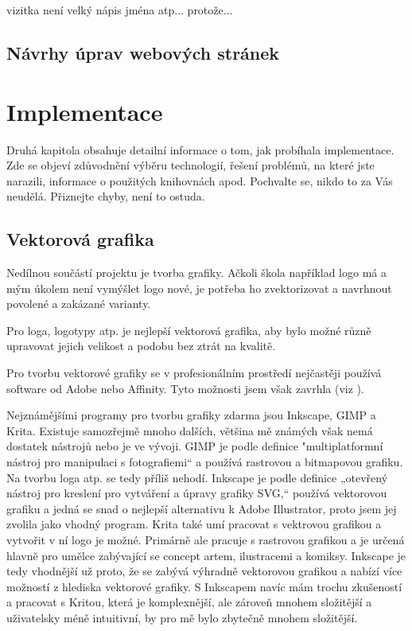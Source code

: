 \documentclass[11pt,a4paper,twoside,openright]{report}
\begin{document}
vizitka není velký nápis jména atp... protože...
\section{Návrhy úprav webových stránek}



\chapter{Implementace}

Druhá kapitola obsahuje detailní informace o tom, jak probíhala implementace. Zde se objeví zdůvodnění výběru technologií, řešení problémů, na které jste narazili, informace o použitých knihovnách apod. Pochvalte se, nikdo to za Vás neudělá. Přiznejte chyby, není to ostuda.

\section{Vektorová grafika}
\label{sec:grafika}
Nedílnou součástí projektu je tvorba grafiky. Ačkoli škola například logo má a mým úkolem není vymýšlet logo nové, je potřeba ho zvektorizovat a navrhnout povolené a zakázané varianty. 

Pro loga, logotypy atp. je nejlepší vektorová grafika, aby bylo možné různě upravovat jejich velikost a podobu bez ztrát na kvalitě.

Pro tvorbu vektorové grafiky se v profesionálním prostředí nejčastěji používá software od Adobe nebo Affinity. Tyto možnosti jsem však zavrhla (viz ).

Nejznámějšími programy pro tvorbu grafiky zdarma jsou Inkscape, GIMP a Krita. Existuje samozřejmě mnoho dalších, většina mě známých však nemá dostatek nástrojů nebo je ve vývoji.
GIMP je podle definice "multiplatformní nástroj pro manipulaci s fotografiemi“ a používá rastrovou a bitmapovou grafiku. Na tvorbu loga atp. se tedy příliš nehodí.
Inkscape je podle definice „otevřený nástroj pro kreslení pro vytváření a úpravy grafiky SVG,“ používá vektorovou grafiku a jedná se snad o nejlepší alternativu k Adobe Illustrator, proto jsem jej zvolila jako vhodný program.
Krita také umí pracovat s vektrovou grafikou a vytvořit v ní logo je možné. Primárně ale pracuje s rastrovou grafikou a je určená hlavně pro umělce zabývající se concept artem, ilustracemi a komiksy. Inkscape je tedy vhodnější už proto, že se zabývá výhradně vektorovou grafikou a nabízí více možností z hlediska vektorové grafiky. S Inkscapem navíc mám trochu zkušeností a pracovat s Kritou, která je komplexnější, ale zároveň mnohem složitější a uživatelsky méně intuitivní, by pro mě bylo zbytečně mnohem složitější.
\end{document}
